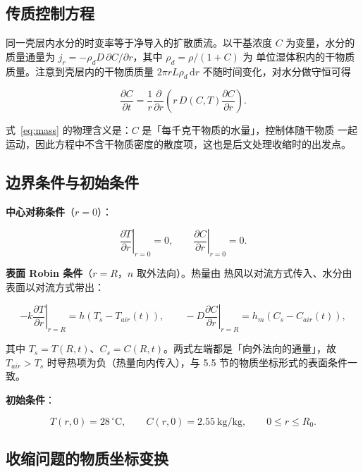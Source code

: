 \subsection{传质控制方程}

同一壳层内水分的时变率等于净导入的扩散质流。以干基浓度 $C$ 为变量，水分的
质量通量为 $j_r=-\rho_{d}D\,\partial C/\partial r$，其中 $\rho_d=\rho/(1+C)$ 为
单位湿体积内的干物质质量。注意到壳层内的干物质质量 $2\pi rL\rho_d\,\mathrm{d}r$
不随时间变化，对水分做守恒可得

\begin{equation}
\frac{\partial C}{\partial t}
=\frac{1}{r}\frac{\partial}{\partial r}\left(r\,D(C,T)\frac{\partial C}{\partial r}\right).
\label{eq:mass}
\end{equation}

式~\eqref{eq:mass} 的物理含义是：$C$ 是「每千克干物质的水量」，控制体随干物质
一起运动，因此方程中不含干物质密度的散度项，这也是后文处理收缩时的出发点。

\subsection{边界条件与初始条件}

\textbf{中心对称条件}（$r=0$）：

\begin{equation}
\left.\frac{\partial T}{\partial r}\right|_{r=0}=0,\qquad
\left.\frac{\partial C}{\partial r}\right|_{r=0}=0 .
\end{equation}

\textbf{表面 Robin 条件}（$r=R$，$n$ 取外法向）\cite{incropera2007}。热量由
热风以对流方式传入、水分由表面以对流方式带出：

\begin{equation}
-k\left.\frac{\partial T}{\partial r}\right|_{r=R}=h\left(T_s-T_{air}(t)\right),
\qquad
-D\left.\frac{\partial C}{\partial r}\right|_{r=R}=h_m\left(C_s-C_{air}(t)\right),
\label{eq:robin}
\end{equation}

其中 $T_s=T(R,t)$、$C_s=C(R,t)$。两式左端都是「向外法向的通量」，故 $T_{air}>T_s$
时导热项为负（热量向内传入），与 5.5 节的物质坐标形式的表面条件一致。

\textbf{初始条件}：

\begin{equation}
T(r,0)=28\,^\circ\mathrm{C},\qquad C(r,0)=2.55\ \mathrm{kg/kg},\qquad 0\le r\le R_0 .
\end{equation}

\subsection{收缩问题的物质坐标变换}

